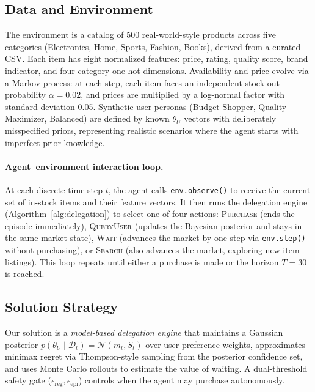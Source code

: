 \documentclass[11pt,letterpaper]{article}
\newcommand{\Purchase}{\textsc{Purchase}}
\newcommand{\QueryUser}{\textsc{QueryUser}}
\newcommand{\Wait}{\textsc{Wait}}
\newcommand{\Search}{\textsc{Search}}
\newcommand{\thetaU}{\theta_U}
\newcommand{\epsreg}{\epsilon_{\mathrm{reg}}}
\newcommand{\epsepi}{\epsilon_{\mathrm{epi}}}
\begin{document}
\subsection{Data and Environment}

The environment is a catalog of 500 real-world-style products across five categories (Electronics, Home, Sports, Fashion, Books), derived from a curated CSV.  Each item has eight normalized features: price, rating, quality score, brand indicator, and four category one-hot dimensions.  Availability and price evolve via a Markov process: at each step, each item faces an independent stock-out probability $\alpha = 0.02$, and prices are multiplied by a log-normal factor with standard deviation 0.05.  Synthetic user personas (Budget Shopper, Quality Maximizer, Balanced) are defined by known $\thetaU$ vectors with deliberately misspecified priors, representing realistic scenarios where the agent starts with imperfect prior knowledge.

\paragraph{Agent--environment interaction loop.}  At each discrete time step $t$, the agent calls \texttt{env.observe()} to receive the current set of in-stock items and their feature vectors.  It then runs the delegation engine (Algorithm~\ref{alg:delegation}) to select one of four actions: \Purchase{} (ends the episode immediately), \QueryUser{} (updates the Bayesian posterior and stays in the same market state), \Wait{} (advances the market by one step via \texttt{env.step()} without purchasing), or \Search{} (also advances the market, exploring new item listings).  This loop repeats until either a purchase is made or the horizon $T = 30$ is reached.

\subsection{Solution Strategy}

Our solution is a \emph{model-based delegation engine} that maintains a Gaussian posterior $p(\thetaU \mid \mathcal{D}_t) = \mathcal{N}(m_t, S_t)$ over user preference weights, approximates minimax regret via Thompson-style sampling from the posterior confidence set, and uses Monte Carlo rollouts to estimate the value of waiting.  A dual-threshold safety gate ($\epsreg, \epsepi$) controls when the agent may purchase autonomously.

\end{document}
